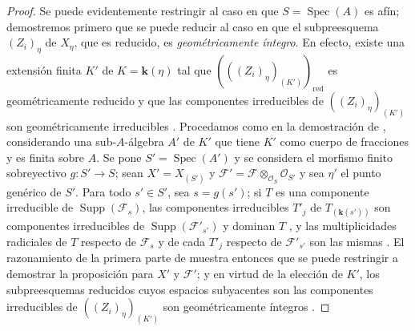 \begin{proof}
\label{IV.9.8.6-proof}
Se puede evidentemente restringir al caso en que $S=\operatorname{Spec}(A)$ es afín; demostremos primero que se puede reducir al caso en que el subpreesquema $(Z_i)_\eta$ de $X_\eta$, que es reducido, es \emph{geométricamente íntegro}.
En efecto, existe una extensión finita $K'$ de $K=\boldsymbol{k}(\eta)$ tal que $(((Z_i)_\eta)_{(K')})_{\mathrm{red}}$ es geométricamente reducido y que las componentes irreducibles de $((Z_i)_\eta)_{(K')}$ son geométricamente irreducibles .
Procedamos como en la demostración de , considerando una sub-$A$-álgebra $A'$ de $K'$ que tiene $K'$ como cuerpo de fracciones y es finita sobre $A$.
Se pone $S'=\operatorname{Spec}(A')$ y se considera el morfismo finito sobreyectivo $g:S'\to S$; sean $X'=X_{(S')}$ y $\mathcal F'=\mathcal F\otimes_{\mathcal O_S}\mathcal O_{S'}$ y sea $\eta'$ el punto genérico de $S'$.
Para todo $s'\in S'$, sea $s=g(s')$; si $T$ es una componente irreducible de $\operatorname{Supp}(\mathcal F_s)$, las componentes irreducibles $T'_j$ de $T_{(\mathbf{k}(s'))}$ son componentes irreducibles de $\operatorname{Supp}(\mathcal F'_{s'})$ y dominan $T$ , y las multiplicidades radiciales de $T$ respecto de $\mathcal F_s$ y de cada $T'_j$ respecto de $\mathcal F'_{s'}$ son las mismas .
El razonamiento de la primera parte de  muestra entonces que se puede restringir a demostrar la proposición para $X'$ y $\mathcal F'$; y en virtud de la elección de $K'$, los subpreesquemas reducidos cuyos espacios subyacentes son las componentes irreducibles de $((Z_i)_\eta)_{(K')}$ son geométricamente íntegros .


\end{proof}
